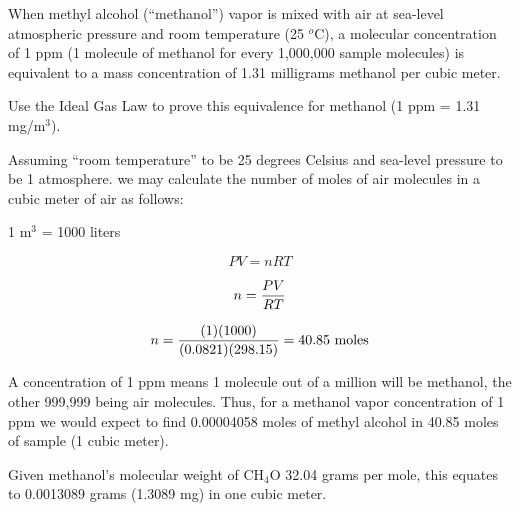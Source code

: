 
When methyl alcohol (``methanol'') vapor is mixed with air at sea-level atmospheric pressure and room temperature (25 $^{o}$C), a molecular concentration of 1 ppm (1 molecule of methanol for every 1,000,000 sample molecules) is equivalent to a mass concentration of 1.31 milligrams methanol per cubic meter.

\vskip 10pt

Use the Ideal Gas Law to prove this equivalence for methanol (1 ppm = 1.31 mg/m$^{3}$).







Assuming ``room temperature'' to be 25 degrees Celsius and sea-level pressure to be 1 atmosphere. we may calculate the number of moles of air molecules in a cubic meter of air as follows:

\vskip 10pt

1 m$^{3}$ = 1000 liters

$$PV = nRT$$

$$n = {PV \over RT}$$

$$n = {(1)(1000) \over (0.0821)(298.15)} = 40.85 \hbox{ moles}$$

A concentration of 1 ppm means 1 molecule out of a million will be methanol, the other 999,999 being air molecules.  Thus, for a methanol vapor concentration of 1 ppm we would expect to find 0.00004058 moles of methyl alcohol in 40.85 moles of sample (1 cubic meter). 

\vskip 10pt

Given methanol's molecular weight of CH$_{4}$O 32.04 grams per mole, this equates to 0.0013089 grams (1.3089 mg) in one cubic meter.











